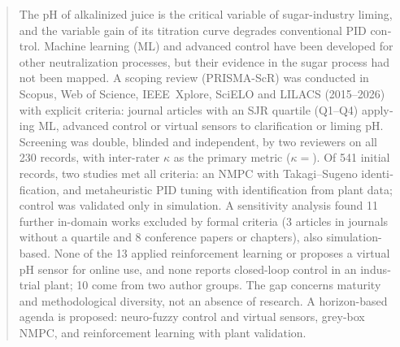 \begin{otherlanguage}{english}
\begin{abstract}

\noindent
The pH of alkalinized juice is the critical variable of sugar-industry
liming, and the variable gain of its titration curve degrades
conventional PID control. Machine learning (ML) and advanced control have
been developed for other neutralization processes, but their evidence in
the sugar process had not been mapped. A scoping review (PRISMA-ScR) was
conducted in Scopus, Web of Science, IEEE~Xplore, SciELO and LILACS
(2015--2026) with explicit criteria: journal articles with an
SJR quartile (Q1--Q4) applying ML, advanced control or virtual sensors to
clarification or liming pH. Screening was double, blinded and
independent, by two reviewers on all 230 records, with inter-rater
$\kappa$ as the primary metric ($\kappa=$\KappaInter). Of 541 initial records, two studies met all criteria: an
NMPC with Takagi--Sugeno identification, and metaheuristic PID tuning
with identification from plant data; control was validated only in
simulation. A sensitivity analysis found 11 further in-domain works
excluded by formal criteria (3 articles in journals without a quartile
and 8 conference papers or chapters), also simulation-based. None of the
13 applied reinforcement learning or proposes a virtual pH sensor for
online use, and none reports closed-loop control in an industrial plant;
10 come from two author groups. The gap concerns maturity and methodological diversity, not an
absence of research. A horizon-based agenda is proposed: neuro-fuzzy
control and virtual sensors, grey-box NMPC, and reinforcement learning
with plant validation.

\medskip
{}

\end{abstract}
\end{otherlanguage}
\clearpage
